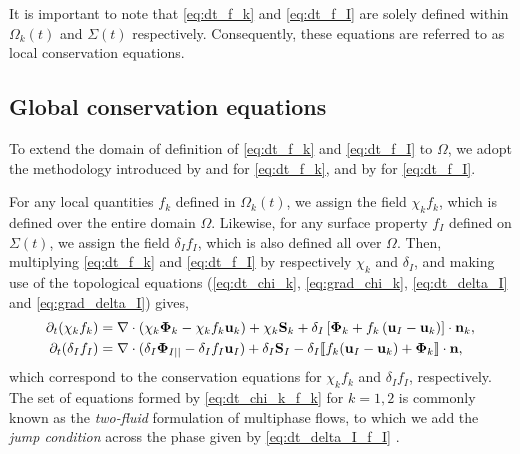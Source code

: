 It is important to note that \ref{eq:dt_f_k} and \ref{eq:dt_f_I} are solely defined within $\Omega_k(t)$ and $\Sigma(t)$ respectively.
Consequently, these equations are referred to as local conservation equations.

\subsection{Global conservation equations}

To extend the domain of definition of \ref{eq:dt_f_k} and \ref{eq:dt_f_I} to $\Omega$, we adopt the methodology introduced by \citet{drew1983mathematical} and \citet{kataoka1986local} for \ref{eq:dt_f_k}, and by \citet{marle1982macroscopic} for \ref{eq:dt_f_I}.

For any local quantities $f_k$ defined in $\Omega_k(t)$, we assign the field $\chi_k f_k$, which is defined over the entire domain $\Omega$. 
Likewise, for any surface property $f_I$ defined on $\Sigma(t)$, we assign the field $\delta_I f_I$, which is also defined all over $\Omega$. 
Then, multiplying \ref{eq:dt_f_k} and \ref{eq:dt_f_I} by respectively $\chi_k$ and $\delta_I$, and making use of the topological equations (\ref{eq:dt_chi_k}, \ref{eq:grad_chi_k}, \ref{eq:dt_delta_I} and \ref{eq:grad_delta_I}) gives, 
\begin{align}
    \partial_t (\chi_k f_k)
    &= \mathbf{\nabla} \cdot (\chi_k \mathbf{\Phi}_k - \chi_k f_k \textbf{u}_k)
    + \chi_k \textbf{S}_k
    + \delta_I\left[
        \mathbf{\Phi}_k
        + f_k
        \left(
            \textbf{u}_I
            - \textbf{u}_k
        \right)
    \right]
    \cdot \textbf{n}_k ,
    \label{eq:dt_chi_k_f_k}\\
    \partial_t (\delta_If_I)  
    &= 
    \mathbf{\nabla} \cdot (\delta_I \mathbf{\Phi}_{I||} - \delta_I f_I \textbf{u}_I)
    +\delta_I\textbf{S}_I 
    - \delta_I \llbracket 
    f_k (\textbf{u}_I - \textbf{u}_k)
    + \mathbf{\Phi}_k
     \rrbracket \cdot \textbf{n},
    \label{eq:dt_delta_I_f_I}
\end{align}
which correspond to the conservation equations for $\chi_kf_k$ and $\delta_If_I$, respectively.
The set of equations formed by \ref{eq:dt_chi_k_f_k} for $k =1,2$ is commonly known as the \textit{two-fluid} formulation of multiphase flows, to which we add the \textit{jump condition} across the phase given by \ref{eq:dt_delta_I_f_I} \citep{morel2015mathematical,tryggvason2011direct,drew1983mathematical,kataoka1986local}. 

